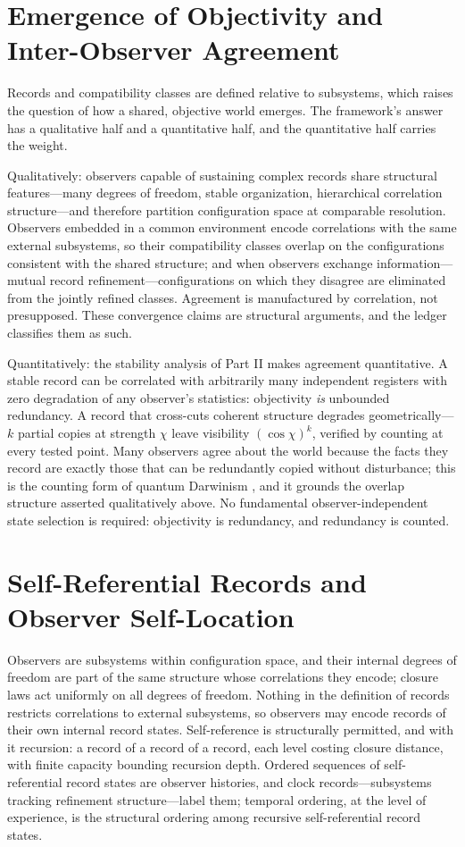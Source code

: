 \documentclass[11pt]{article}
\theoremstyle{definition}
\theoremstyle{remark}
\begin{document}
\section{Emergence of Objectivity and Inter-Observer Agreement}\label{sec:objectivity}
Records and compatibility classes are defined relative to subsystems, which raises the question of how a shared, objective world emerges. The framework's answer has a qualitative half and a quantitative half, and the quantitative half carries the weight.

Qualitatively: observers capable of sustaining complex records share structural features---many degrees of freedom, stable organization, hierarchical correlation structure---and therefore partition configuration space at comparable resolution. Observers embedded in a common environment encode correlations with the same external subsystems, so their compatibility classes overlap on the configurations consistent with the shared structure; and when observers exchange information---mutual record refinement---configurations on which they disagree are eliminated from the jointly refined classes. Agreement is manufactured by correlation, not presupposed. These convergence claims are structural arguments, and the ledger classifies them as such.

Quantitatively: the stability analysis of Part II makes agreement quantitative. A stable record can be correlated with arbitrarily many independent registers with zero degradation of any observer's statistics: objectivity \emph{is} unbounded redundancy. A record that cross-cuts coherent structure degrades geometrically---$k$ partial copies at strength $\chi$ leave visibility $(\cos\chi)^k$, verified by counting at every tested point. Many observers agree about the world because the facts they record are exactly those that can be redundantly copied without disturbance; this is the counting form of quantum Darwinism \cite{Zurek2009}, and it grounds the overlap structure asserted qualitatively above. No fundamental observer-independent state selection is required: objectivity is redundancy, and redundancy is counted.

\section{Self-Referential Records and Observer Self-Location}\label{sec:self}
Observers are subsystems within configuration space, and their internal degrees of freedom are part of the same structure whose correlations they encode; closure laws act uniformly on all degrees of freedom. Nothing in the definition of records restricts correlations to external subsystems, so observers may encode records of their own internal record states. Self-reference is structurally permitted, and with it recursion: a record of a record of a record, each level costing closure distance, with finite capacity bounding recursion depth. Ordered sequences of self-referential record states are observer histories, and clock records---subsystems tracking refinement structure---label them; temporal ordering, at the level of experience, is the structural ordering among recursive self-referential record states.
\end{document}
